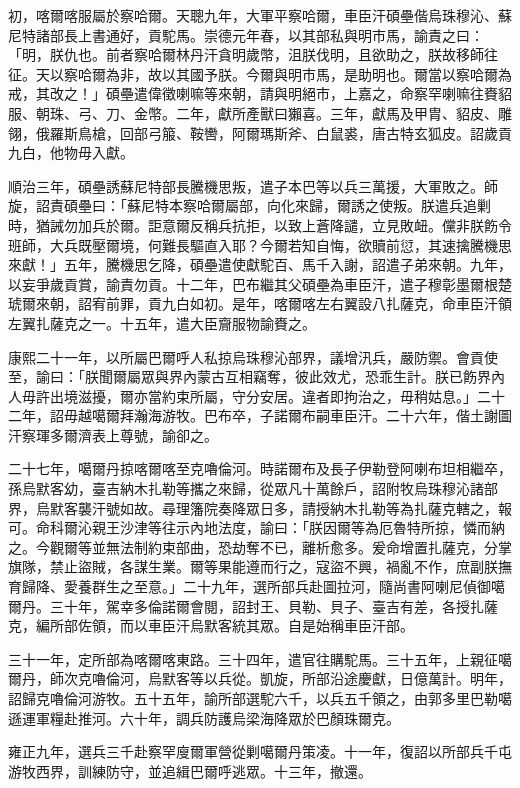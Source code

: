 \begin{pinyinscope}
初，喀爾喀服屬於察哈爾。天聰九年，大軍平察哈爾，車臣汗碩壘偕烏珠穆沁、蘇尼特諸部長上書通好，貢駝馬。崇德元年春，以其部私與明市馬，諭責之曰：「明，朕仇也。前者察哈爾林丹汗貪明歲幣，沮朕伐明，且欲助之，朕故移師往征。天以察哈爾為非，故以其國予朕。今爾與明市馬，是助明也。爾當以察哈爾為戒，其改之！」碩壘遣偉徵喇嘛等來朝，請與明絕市，上嘉之，命察罕喇嘛往賚貂服、朝珠、弓、刀、金幣。二年，獻所產獸曰獺喜。三年，獻馬及甲胄、貂皮、雕翎，俄羅斯鳥槍，回部弓箙、鞍轡，阿爾瑪斯斧、白鼠裘，唐古特玄狐皮。詔歲貢九白，他物毋入獻。

順治三年，碩壘誘蘇尼特部長騰機思叛，遣子本巴等以兵三萬援，大軍敗之。師旋，詔責碩壘曰：「蘇尼特本察哈爾屬部，向化來歸，爾誘之使叛。朕遣兵追剿時，猶誡勿加兵於爾。詎意爾反稱兵抗拒，以致上蒼降譴，立見敗衄。儻非朕飭令班師，大兵既壓爾境，何難長驅直入耶？今爾若知自悔，欲贖前愆，其速擒騰機思來獻！」五年，騰機思乞降，碩壘遣使獻駝百、馬千入謝，詔遣子弟來朝。九年，以妄爭歲貢賞，諭責勿貢。十二年，巴布繼其父碩壘為車臣汗，遣子穆彰墨爾根楚琥爾來朝，詔宥前罪，貢九白如初。是年，喀爾喀左右翼設八扎薩克，命車臣汗領左翼扎薩克之一。十五年，遣大臣齎服物諭賚之。

康熙二十一年，以所屬巴爾呼人私掠烏珠穆沁部界，議增汛兵，嚴防禦。會貢使至，諭曰：「朕聞爾屬眾與界內蒙古互相竊奪，彼此效尤，恐乖生計。朕已飭界內人毋許出境滋擾，爾亦當約束所屬，守分安居。違者即拘治之，毋稍姑息。」二十二年，詔毋越噶爾拜瀚海游牧。巴布卒，子諾爾布嗣車臣汗。二十六年，偕土謝圖汗察琿多爾濟表上尊號，諭卻之。

二十七年，噶爾丹掠喀爾喀至克嚕倫河。時諾爾布及長子伊勒登阿喇布坦相繼卒，孫烏默客幼，臺吉納木扎勒等攜之來歸，從眾凡十萬餘戶，詔附牧烏珠穆沁諸部界，烏默客襲汗號如故。尋理籓院奏降眾日多，請授納木扎勒等為扎薩克轄之，報可。命科爾沁親王沙津等往示內地法度，諭曰：「朕因爾等為厄魯特所掠，憐而納之。今觀爾等並無法制約束部曲，恐劫奪不已，離析愈多。爰命增置扎薩克，分掌旗隊，禁止盜賊，各謀生業。爾等果能遵而行之，寇盜不興，禍亂不作，庶副朕撫育歸降、愛養群生之至意。」二十九年，選所部兵赴圖拉河，隨尚書阿喇尼偵御噶爾丹。三十年，駕幸多倫諾爾會閱，詔封王、貝勒、貝子、臺吉有差，各授扎薩克，編所部佐領，而以車臣汗烏默客統其眾。自是始稱車臣汗部。

三十一年，定所部為喀爾喀東路。三十四年，遣官往購駝馬。三十五年，上親征噶爾丹，師次克嚕倫河，烏默客等以兵從。凱旋，所部沿途慶獻，日億萬計。明年，詔歸克嚕倫河游牧。五十五年，諭所部選駝六千，以兵五千領之，由郭多里巴勒噶遜運軍糧赴推河。六十年，調兵防護烏梁海降眾於巴顏珠爾克。

雍正九年，選兵三千赴察罕廋爾軍營從剿噶爾丹策凌。十一年，復詔以所部兵千屯游牧西界，訓練防守，並追緝巴爾呼逃眾。十三年，撤還。


\end{pinyinscope}
